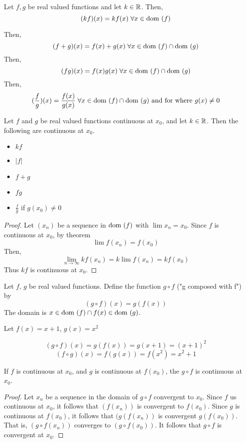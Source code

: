 \documentclass{article}
\begin{document}
\begin{definition}
Let $f, g$ be real valued functions and let $k \in \mathbb{R}$. Then, \[(kf)(x) = kf(x) \; \forall x \in \text{dom }(f)\]

Then, \[(f + g)(x) = f(x) + g(x) \; \forall x \in \text{dom }(f) \cap \text{dom }(g)\]
Then, \[(fg)(x) = f(x)g(x) \; \forall x \in \text{dom }(f) \cap \text{dom }(g)\]
Then, \[(\frac{f}{g})(x) = \frac{f(x)}{g(x)} \; \forall x \in \text{dom }(f) \cap \text{dom }(g) \text{ and for where } g(x) \neq 0\]
\end{definition}
\begin{cthm}[Theorem 17.3 \& 17.4]
Let $f$ and $g$ be real valued functions continuous at $x_0$, and let $k \in \mathbb{R}$. Then the following are continuous at $x_0$.
\begin{itemize}
    \item $kf$
    \item $|f|$
    \item $f + g$
    \item $fg$
    \item $\frac{f}{g}$ if $g(x_0) \neq 0$
\end{itemize}
\end{cthm}
\begin{proof}
Let $(x_n)$ be a sequence in $\text{dom }(f)$ with $\lim x_n = x_0$. Since $f$ is continuous at $x_0$, by theorem \[
\lim f(x_n) = f(x_0)
\]
Then, \[
\lim_{n\to\infty} kf(x_n) = k \lim f(x_n) = kf(x_0)
\]
Thus $kf$ is continuous at $x_0$.
\end{proof}
\begin{definition}
Let $f$, $g$ be real valued functions. Define the function $g \circ f$ ("g composed with f") by \[
(g \circ f)(x) = g(f(x))
\]
The domain is $x \in \text{dom }(f) \cap f(x) \in \text{dom }(g)$.
\end{definition}
\begin{example}
Let $f(x) = x + 1$, $g(x) = x^2$

\[
(g \circ f)(x) = g(f(x)) = g(x+1) = (x+1)^2
\]
\[
(f \circ g)(x) = f(g(x)) = f(x^2) = x^2 + 1
\]
\end{example}
\begin{cthm}[Theorem 17.5]
If $f$ is continuous at $x_0$, and $g$ is continuous at $f(x_0)$, the  $g \circ f$ is continuous at $x_0$.
\end{cthm}
\begin{proof}
Let $x_n$ be a sequence in the domain of $g \circ f$ convergent to $x_0$.
Since $f$ us continuous at $x_0$, it follows that $(f(x_n))$ is convergent to $f(x_0)$. Since $g$ is continuous at $f(x_0)$, it follows that $(g(f(x_n))$ is convergent $g(f(x_0))$. That is, $(g \circ f(x_n))$ converges to $(g \circ f(x_0))$. It follows that $g \circ f$ is convergent at $x_0$.
\end{proof}
\end{document}
